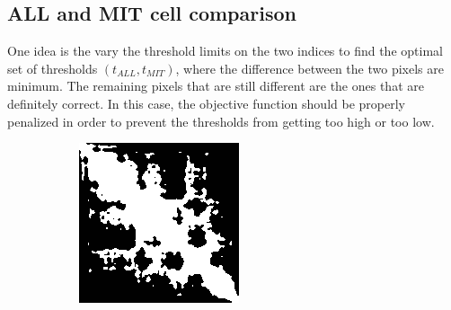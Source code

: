 \documentclass{article}
\begin{document}
\subsection*{ALL and MIT cell comparison}
One idea is the vary the threshold limits on the two indices to 
find the optimal set of thresholds $(t_{ALL}, t_{MIT})$, where 
the difference between the two pixels are minimum. The remaining
pixels that are still different are the ones that are definitely
correct. In this case, the objective function should be properly
penalized in order to prevent the thresholds from getting too
high or too low.
\begin{figure}[H]
    \centering
    \begin{subfigure}[b]{.45\textwidth} 
        \includegraphics[width=\textwidth]{figures/ALL_60per_thresh.png}
        \caption{}
        \label{fig:all_thresh}
    \end{subfigure}
    \begin{subfigure}[b]{.45\textwidth}

\end{subfigure}
\end{figure}
\end{document}
